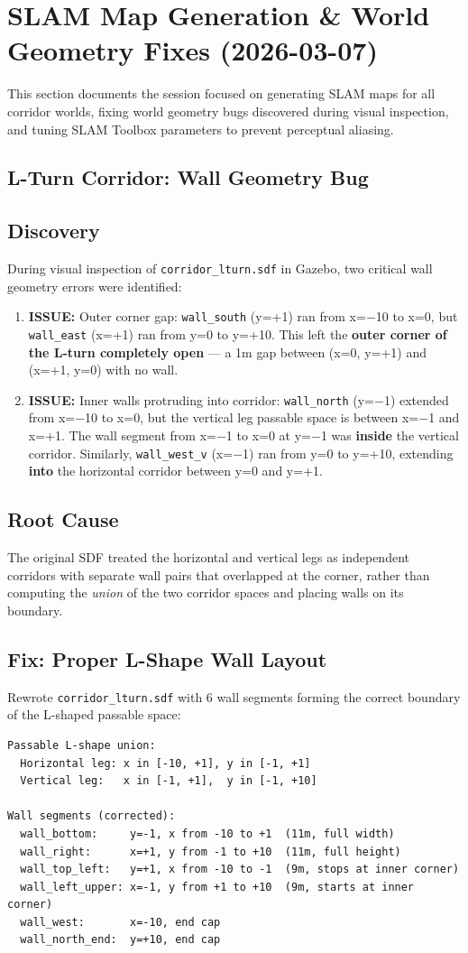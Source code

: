 \documentclass[11pt]{article}
\newcommand{\logentry}[1]{\subsection*{#1}}
\newcommand{\issue}[1]{\textcolor{issuered}{\textbf{ISSUE:} #1}}
\begin{document}
\section{SLAM Map Generation \& World Geometry Fixes (2026-03-07)}

This section documents the session focused on generating SLAM maps for all
corridor worlds, fixing world geometry bugs discovered during visual inspection,
and tuning SLAM Toolbox parameters to prevent perceptual aliasing.

\subsection*{L-Turn Corridor: Wall Geometry Bug}

\logentry{Discovery}
During visual inspection of \texttt{corridor\_lturn.sdf} in Gazebo, two
critical wall geometry errors were identified:

\begin{enumerate}
  \item \issue{Outer corner gap:} \texttt{wall\_south} (y=+1) ran from x=$-$10 to
    x=0, but \texttt{wall\_east} (x=+1) ran from y=0 to y=+10. This left the
    \textbf{outer corner of the L-turn completely open} --- a 1m gap between
    (x=0, y=+1) and (x=+1, y=0) with no wall.
  \item \issue{Inner walls protruding into corridor:} \texttt{wall\_north} (y=$-$1)
    extended from x=$-$10 to x=0, but the vertical leg passable space is between
    x=$-$1 and x=+1. The wall segment from x=$-$1 to x=0 at y=$-$1 was
    \textbf{inside} the vertical corridor. Similarly, \texttt{wall\_west\_v}
    (x=$-$1) ran from y=0 to y=+10, extending \textbf{into} the horizontal
    corridor between y=0 and y=+1.
\end{enumerate}

\logentry{Root Cause}
The original SDF treated the horizontal and vertical legs as independent corridors
with separate wall pairs that overlapped at the corner, rather than computing the
\emph{union} of the two corridor spaces and placing walls on its boundary.

\logentry{Fix: Proper L-Shape Wall Layout}
Rewrote \texttt{corridor\_lturn.sdf} with 6 wall segments forming the correct
boundary of the L-shaped passable space:

\begin{lstlisting}
Passable L-shape union:
  Horizontal leg: x in [-10, +1], y in [-1, +1]
  Vertical leg:   x in [-1, +1],  y in [-1, +10]

Wall segments (corrected):
  wall_bottom:     y=-1, x from -10 to +1  (11m, full width)
  wall_right:      x=+1, y from -1 to +10  (11m, full height)
  wall_top_left:   y=+1, x from -10 to -1  (9m, stops at inner corner)
  wall_left_upper: x=-1, y from +1 to +10  (9m, starts at inner corner)
  wall_west:       x=-10, end cap
  wall_north_end:  y=+10, end cap
\end{lstlisting}
\end{document}

